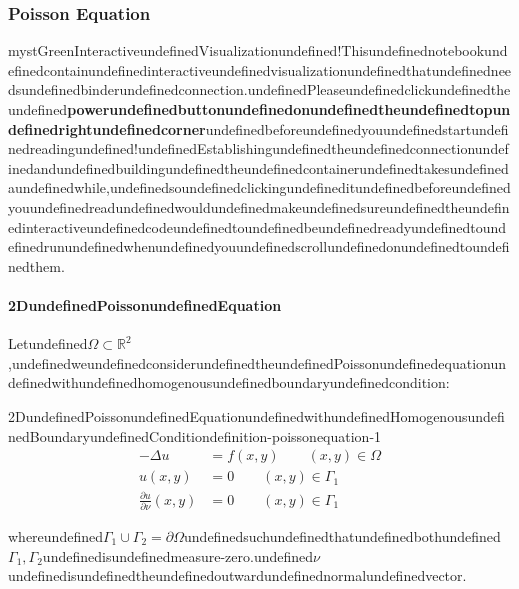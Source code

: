 \subsubsection{Poisson Equation}

\begin{mystadmonition}{mystGreen}{InteractiveundefinedVisualizationundefined!}Thisundefinednotebookundefinedcontainundefinedinteractiveundefinedvisualizationundefinedthatundefinedneedsundefinedbinderundefinedconnection.undefinedPleaseundefinedclickundefinedtheundefined\textbf{powerundefinedbuttonundefinedonundefinedtheundefinedtopundefinedrightundefinedcorner}undefinedbeforeundefinedyouundefinedstartundefinedreadingundefined!undefinedEstablishingundefinedtheundefinedconnectionundefinedandundefinedbuildingundefinedtheundefinedcontainerundefinedtakesundefinedaundefinedwhile,undefinedsoundefinedclickingundefineditundefinedbeforeundefinedyouundefinedreadundefinedwouldundefinedmakeundefinedsureundefinedtheundefinedinteractiveundefinedcodeundefinedtoundefinedbeundefinedreadyundefinedtoundefinedrunundefinedwhenundefinedyouundefinedscrollundefinedonundefinedtoundefinedthem.

\end{mystadmonition}
\paragraph{2DundefinedPoissonundefinedEquation}

Letundefined$\Omega \subset \mathbb{R}^2$,undefinedweundefinedconsiderundefinedtheundefinedPoissonundefinedequationundefinedwithundefinedhomogenousundefinedboundaryundefinedcondition:

\begin{mystthmdefinition}{2DundefinedPoissonundefinedEquationundefinedwithundefinedHomogenousundefinedBoundaryundefinedCondition}{definition-poissonequation-1}\begin{equation}
\label{2dpoihb}
\begin{aligned}
-\Delta u &= f(x,y) \qquad (x,y)\in \Omega \\
  u(x,y) &= 0 \qquad (x,y)\in \Gamma_1 \\
  \frac{\partial u}{\partial \nu}(x,y) &= 0 \qquad (x,y)\in \Gamma_1
\end{aligned}
\end{equation}

\end{mystthmdefinition}
whereundefined$\Gamma_1\cup \Gamma_2 = \partial \Omega$undefinedsuchundefinedthatundefinedbothundefined$\Gamma_1, \Gamma_2$undefinedisundefinedmeasure-zero.undefined$\nu$undefinedisundefinedtheundefinedoutwardundefinednormalundefinedvector.


